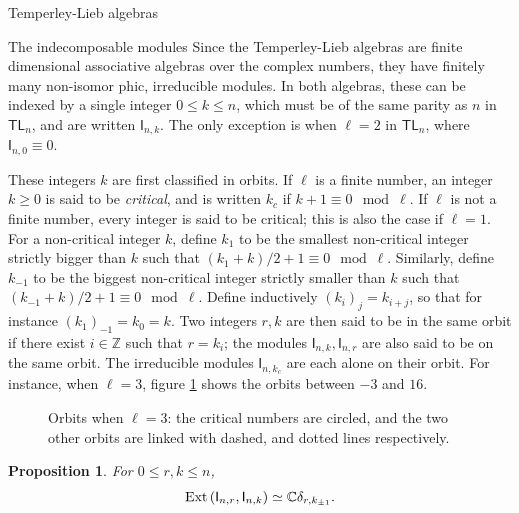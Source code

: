 \documentclass[reqno]{amsart}
\newtheorem{Prop}[Thm]{Proposition}
\newcommand{\tl}[1]{\mathsf{TL}_{#1}}
\newcommand{\dl}[1]{\mathsf I_{#1}}
\newcommand{\kc}{k_c}
\begin{document}
\begin{section}{Temperley-Lieb algebras}
%
\begin{subsection}{The indecomposable modules}\label{sec:rappel.indec}
%
Since the Temperley-Lieb algebras are finite dimensional associative algebras over the complex numbers, they have finitely many non-isomor\- phic, irreducible modules. In both algebras, these can be indexed by a single integer $0 \leq k \leq n$, which must be of the same parity as $n$ in $\tl{n}$, and are written $\dl{n,k}$. The only exception is when $\ell = 2$ in $\tl{n}$, where $\dl{n,0} \equiv 0$.

 These integers $k$ are first classified in orbits. If $\ell$ is a finite number, an integer $k \geq 0$ is said to be \emph{critical}, and is written  $\kc$ if $k+1 \equiv 0 \mod \ell$. If $\ell$ is not a finite number, every integer is said to be critical; this is also the case if $\ell = 1$. For a non-critical integer $k$, define $k_{1}$ to be the smallest non-critical integer strictly bigger than $k$  such that $(k_{1} + k )/2 +1 \equiv 0 \mod \ell$. Similarly, define $k_{-1}$ to be the biggest non-critical integer strictly smaller than $k$ such that $(k_{-1} + k)/2 +1 \equiv 0 \mod \ell$. Define inductively $(k_{i})_{j}= k_{i+j}$, so that for instance $(k_{1})_{-1} = k_{0} = k$. Two integers $r,k$ are then said to be in the same orbit if there exist $i \in \mathbb{Z}$ such that $r=k_{i}$; the modules $\dl{n,k},\dl{n,r}$ are also said to be on the same orbit. The irreducible modules $\dl{n,\kc}$ are each alone on their orbit. For instance, when $\ell = 3$, figure \ref{fig:orbits} shows the orbits between $-3$ and $16$.
\begin{figure}[h]
\caption{Orbits when $\ell=3$: the critical numbers are circled, and the two other orbits are linked with dashed, and dotted lines respectively.}\label{fig:orbits}
\end{figure}
\begin{Prop}\label{prop:extensions}
For $0 \leq r,k \leq n$,
\begin{equation}
\text{\rm{Ext}}\left(\dl{n,r},\dl{n,k}\right) \simeq \mathbb{C}\delta_{r,k_{\pm 1}}.
\end{equation}
\end{Prop} 


\end{subsection}
\end{section}
\end{document}
